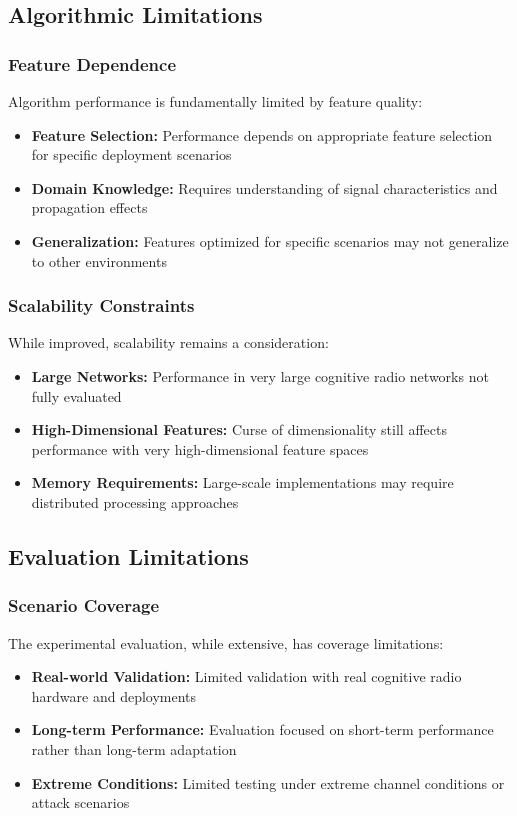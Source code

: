 \subsection{Algorithmic Limitations}

\subsubsection{Feature Dependence}
Algorithm performance is fundamentally limited by feature quality:
\begin{itemize}
\item \textbf{Feature Selection:} Performance depends on appropriate feature selection for specific deployment scenarios
\item \textbf{Domain Knowledge:} Requires understanding of signal characteristics and propagation effects
\item \textbf{Generalization:} Features optimized for specific scenarios may not generalize to other environments
\end{itemize}

\subsubsection{Scalability Constraints}
While improved, scalability remains a consideration:
\begin{itemize}
\item \textbf{Large Networks:} Performance in very large cognitive radio networks not fully evaluated
\item \textbf{High-Dimensional Features:} Curse of dimensionality still affects performance with very high-dimensional feature spaces
\item \textbf{Memory Requirements:} Large-scale implementations may require distributed processing approaches
\end{itemize}

\subsection{Evaluation Limitations}

\subsubsection{Scenario Coverage}
The experimental evaluation, while extensive, has coverage limitations:
\begin{itemize}
\item \textbf{Real-world Validation:} Limited validation with real cognitive radio hardware and deployments
\item \textbf{Long-term Performance:} Evaluation focused on short-term performance rather than long-term adaptation
\item \textbf{Extreme Conditions:} Limited testing under extreme channel conditions or attack scenarios
\end{itemize}

